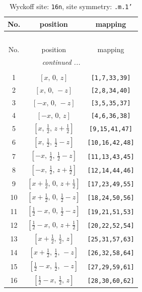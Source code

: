 \documentclass[fleqn,8pt]{jsarticle}
\begin{document}
\renewcommand{\arraystretch}{1.2}
\begin{longtable}{ccc}
\caption{Wyckoff site: {\tt 16n}, site symmetry: {\tt .m.1'}}
 \\
 \hline \hline
No. & position & mapping \\ \hline \endfirsthead

\multicolumn{2}{l}{\tablename\ \thetable{}} \\
 \hline \hline
No. & position & mapping \\ \hline \endhead

 \hline \hline
\multicolumn{2}{r}{\footnotesize\it continued ...} \\ \endfoot

 \hline \hline
\multicolumn{2}{r}{} \\ \endlastfoot

1 & $\left[ x,\, 0,\, z \right]$ & {\tt [1,7,33,39]} \\ \hline
2 & $\left[ x,\, 0,\, - z \right]$ & {\tt [2,8,34,40]} \\ \hline
3 & $\left[ - x,\, 0,\, - z \right]$ & {\tt [3,5,35,37]} \\ \hline
4 & $\left[ - x,\, 0,\, z \right]$ & {\tt [4,6,36,38]} \\ \hline
5 & $\left[ x,\, \frac{1}{2},\, z + \frac{1}{2} \right]$ & {\tt [9,15,41,47]} \\ \hline
6 & $\left[ x,\, \frac{1}{2},\, \frac{1}{2} - z \right]$ & {\tt [10,16,42,48]} \\ \hline
7 & $\left[ - x,\, \frac{1}{2},\, \frac{1}{2} - z \right]$ & {\tt [11,13,43,45]} \\ \hline
8 & $\left[ - x,\, \frac{1}{2},\, z + \frac{1}{2} \right]$ & {\tt [12,14,44,46]} \\ \hline
9 & $\left[ x + \frac{1}{2},\, 0,\, z + \frac{1}{2} \right]$ & {\tt [17,23,49,55]} \\ \hline
10 & $\left[ x + \frac{1}{2},\, 0,\, \frac{1}{2} - z \right]$ & {\tt [18,24,50,56]} \\ \hline
11 & $\left[ \frac{1}{2} - x,\, 0,\, \frac{1}{2} - z \right]$ & {\tt [19,21,51,53]} \\ \hline
12 & $\left[ \frac{1}{2} - x,\, 0,\, z + \frac{1}{2} \right]$ & {\tt [20,22,52,54]} \\ \hline
13 & $\left[ x + \frac{1}{2},\, \frac{1}{2},\, z \right]$ & {\tt [25,31,57,63]} \\ \hline
14 & $\left[ x + \frac{1}{2},\, \frac{1}{2},\, - z \right]$ & {\tt [26,32,58,64]} \\ \hline
15 & $\left[ \frac{1}{2} - x,\, \frac{1}{2},\, - z \right]$ & {\tt [27,29,59,61]} \\ \hline
16 & $\left[ \frac{1}{2} - x,\, \frac{1}{2},\, z \right]$ & {\tt [28,30,60,62]} \\
\end{longtable}
\end{document}

